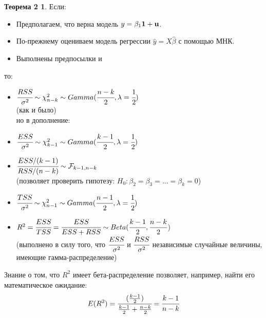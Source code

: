 \documentclass[12pt]{article} %
\theoremstyle{definition} %
\def \hb{\hat{\beta}}
\def \hy{\hat{y}}
\def \cF{\mathcal{F}}
\def \cChi{\mathcal{\chi}}
\begin{document}
\newtheorem*{theo_nn}{Теорема 2}
\begin{theo_nn}
    
    Если:
    \begin{itemize}
        \item \text{[ТГМ1'] } Предполагаем, что верна модель $y=\beta_1 \bf{1} +u$.
        \item \text{[ТГМ2] } По-прежнему оцениваем модель регрессии $\hy = X\hb$ с помощью МНК.
        \item Выполнены предпосылки \text{[ТГМ3-5] } и \text{[нормальность] }
    \end{itemize}
    
    то:
    \begin{itemize}
        \item $\cfrac{RSS}{\sigma^2} \sim \cChi_{n-k}^2 \sim Gamma(\cfrac{n-k}{2}, \lambda=\cfrac{1}{2})$ \\
        (как и было) \\
        но в дополнение:
        \item $\cfrac{ESS}{\sigma^2} \sim \cChi_{k-1}^2 \sim Gamma(\cfrac{k-1}{2}, \lambda=\cfrac{1}{2})$
        \item $\cfrac{ESS/(k - 1)}{RSS/(n-k)} \sim \cF_{k - 1, n-k}$ \\
        (позволяет проверить гипотезу: $H_0: \beta_2 = \beta_3 =...=\beta_k=0$)
        \item $\cfrac{TSS}{\sigma^2} \sim \cChi_{n-1}^2 \sim Gamma(\cfrac{n-1}{2}, \lambda=\cfrac{1}{2})$
        \item $R^2 = \cfrac{ESS}{TSS} = \cfrac{ESS}{ESS+RSS} \sim Beta(\cfrac{k-1}{2}, \cfrac{n-k}{2}$) \\
        (выполнено в силу того, что $\cfrac{ESS}{\sigma^2}$ и $\cfrac{RSS}{\sigma^2}$ независимые случайные величины, имеющие гамма-распределение)
    \end{itemize}
    
\end{theo_nn}

Знание о том, что $R^2$ имеет бета-распределение позволяет, например, найти его математическое ожидание:
    \[
        E(R^2) = \cfrac{(\frac{k-1}{2})}{\frac{k-1}{2}+\frac{n-k}{2}} = \cfrac{k-1}{n-k}
    \]
\end{document}

